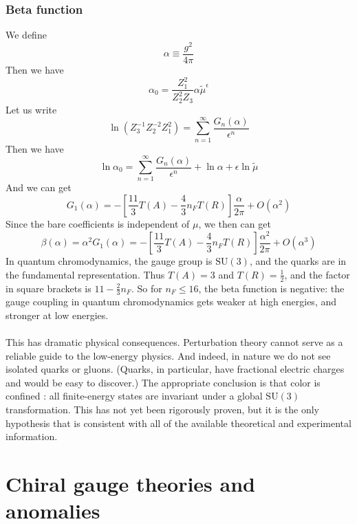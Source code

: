 \subsubsection{Beta function}
We define
\[\alpha \equiv \frac{g^2}{4\pi}\]
Then we have
\[\alpha_0 = \frac{Z_1^2}{Z_2^2 Z_3} \alpha \tilde{\mu}^{\epsilon}\]
Let us write
\[\ln \left( Z_3^{-1}Z_2^{-2}Z_1^2 \right) = \sum_{n=1}^{\infty} \frac{G_n(\alpha)}{\epsilon^n}\]
Then we have
\[\ln \alpha_0 = \sum_{n=1}^{\infty} \frac{G_n(\alpha)}{\epsilon^n} + \ln \alpha + \epsilon \ln \tilde{\mu}\]
And we can get
\[G_1(\alpha) = - \left[ \frac{11}{3}T(A) - \frac{4}{3} n_F T(R) \right] \frac{\alpha}{2\pi} + O(\alpha^2)\]
Since the bare coefficients is independent of $\mu$, we then can get
\[\beta(\alpha) = \alpha^2 G_1(\alpha) = - \left[ \frac{11}{3}T(A) - \frac{4}{3} n_F T(R) \right] \frac{\alpha^2}{2\pi} + O(\alpha^3)\]
In quantum chromodynamics, the gauge group is $\mathrm{SU}(3)$, and the quarks are in the fundamental representation. Thus $T(A) = 3$ and $T(R) = \frac{1}{2}$, and the factor in square brackets is $11 - \frac{2}{3} n_F$. So for $n_F \leq 16$, the beta function is negative: the gauge coupling in quantum chromodynamics gets weaker at high energies, and stronger at low energies.\\ \\
This has dramatic physical consequences. Perturbation theory cannot serve as a reliable guide to the low-energy physics. And indeed, in nature we do not see isolated quarks or gluons. (Quarks, in particular, have fractional electric charges and would be easy to discover.) The appropriate conclusion is that color is confined : all finite-energy states are invariant under a global $\mathrm{SU}(3)$ transformation. This has not yet been rigorously proven, but it is the
only hypothesis that is consistent with all of the available theoretical and experimental information.

\section{Chiral gauge theories and anomalies}
